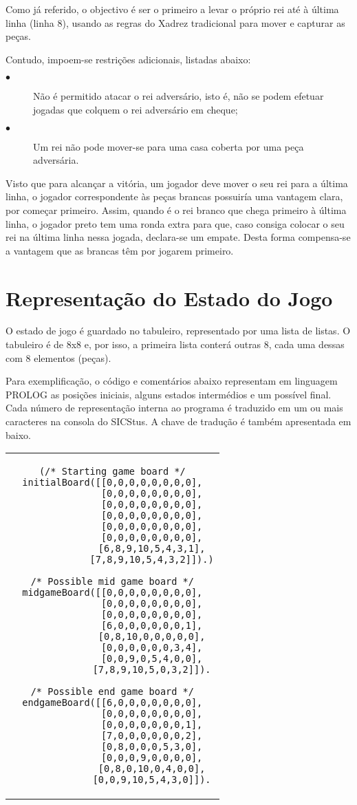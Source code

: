 \documentclass[12pt]{article}
\begin{document}
Como já referido, o objectivo é ser o primeiro a levar o próprio rei até à última linha (linha 8), usando as regras do Xadrez tradicional para mover e capturar as peças. 

Contudo, impoem-se restrições adicionais, listadas abaixo:
\begin{description}
  \item[$\bullet$] Não é permitido atacar o rei adversário, isto é, não se podem efetuar jogadas que colquem o rei adversário em cheque;
  \item[$\bullet$] Um rei não pode mover-se para uma casa coberta por uma peça adversária.
\end{description}
Visto que para alcançar a vitória, um jogador deve mover o seu rei para a última linha, o jogador correspondente às peças brancas possuiría uma vantagem clara, por começar primeiro. Assim, quando é o rei branco que chega primeiro à última linha, o jogador preto tem uma ronda extra para que, caso consiga colocar o seu rei na última linha nessa jogada, declara-se um empate. Desta forma compensa-se a vantagem que as brancas têm por jogarem primeiro.


\section{Representação do Estado do Jogo}

O estado de jogo é guardado no tabuleiro, representado por uma lista de listas.
O tabuleiro é de 8x8 e, por isso, a primeira lista conterá outras 8, cada uma dessas com 8 elementos (peças).

Para exemplificação, o código e comentários abaixo representam em linguagem PROLOG as posições iniciais,
alguns estados intermédios e um possível final. Cada número de representação interna ao programa é
traduzido em um ou mais caracteres na consola do SICStus.
A chave de tradução é também apresentada em baixo.

\begin{center}
\begin{tabular}{c}
\begin{lstlisting}
(/* Starting game board */
initialBoard([[0,0,0,0,0,0,0,0],
              [0,0,0,0,0,0,0,0],
              [0,0,0,0,0,0,0,0],
              [0,0,0,0,0,0,0,0],
              [0,0,0,0,0,0,0,0],
              [0,0,0,0,0,0,0,0],
              [6,8,9,10,5,4,3,1],
              [7,8,9,10,5,4,3,2]]).)

/* Possible mid game board */
midgameBoard([[0,0,0,0,0,0,0,0],
              [0,0,0,0,0,0,0,0],
              [0,0,0,0,0,0,0,0],
              [6,0,0,0,0,0,0,1],
              [0,8,10,0,0,0,0,0],
              [0,0,0,0,0,0,3,4],
              [0,0,9,0,5,4,0,0],
              [7,8,9,10,5,0,3,2]]).

/* Possible end game board */
endgameBoard([[6,0,0,0,0,0,0,0],
              [0,0,0,0,0,0,0,0],
              [0,0,0,0,0,0,0,1],
              [7,0,0,0,0,0,0,2],
              [0,8,0,0,0,5,3,0],
              [0,0,0,9,0,0,0,0],
              [0,8,0,10,0,4,0,0],
              [0,0,9,10,5,4,3,0]]).
\end{lstlisting}
\end{tabular}
\end{center}
\end{document}
